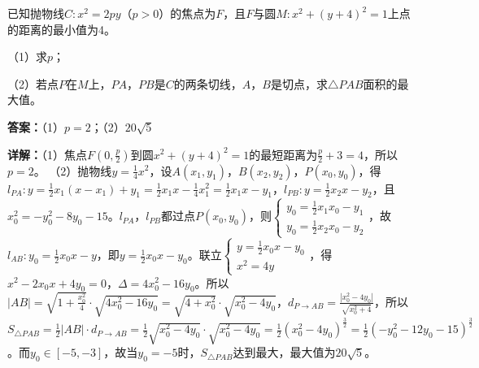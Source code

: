 \begin{question}[points=12]
已知抛物线$C:x^2=2py$（$p>0$）的焦点为$F$，且$F$与圆$M:x^2+(y+4)^2=1$上点的距离的最小值为4。

（1）求$p$；

（2）若点$P$在$M$上，$PA$，$PB$是$C$的两条切线，$A$，$B$是切点，求$\triangle PAB$面积的最大值。
\begin{solution}
\textbf{答案：}（1）$p=2$；（2）$20\sqrt{5}$

\textbf{详解：}（1）焦点$F(0,\frac{p}{2})$到圆$x^2+(y+4)^2=1$的最短距离为$\frac{p}{2}+3=4$，所以$p=2$。
（2）抛物线$y=\frac14x^2$，设$A(x_1,y_1)$，$B(x_2,y_2)$，$P(x_0,y_0)$，得$l_{PA}: y=\frac12x_1(x-x_1)+y_1=\frac12x_1x-\frac14x_1^2=\frac12x_1x-y_1$，$l_{PB}: y=\frac12x_2x-y_2$，且$x_0^2=-y_0^2-8y_0-15$。$l_{PA}$，$l_{PB}$都过点$P(x_0,y_0)$，则$\begin{cases} y_0=\frac12x_1x_0-y_1 \\ y_0=\frac12x_2x_0-y_2 \end{cases}$，故$l_{AB}: y_0=\frac12x_0x-y$，即$y=\frac12x_0x-y_0$。联立$\begin{cases} y=\frac12x_0x-y_0 \\ x^2=4y \end{cases}$，得$x^2-2x_0x+4y_0=0$，$\Delta=4x_0^2-16y_0$。所以$|AB|=\sqrt{1+\frac{x_0^2}{4}}\cdot\sqrt{4x_0^2-16y_0}=\sqrt{4+x_0^2}\cdot\sqrt{x_0^2-4y_0}$，$d_{P\to AB}=\frac{|x_0^2-4y_0|}{\sqrt{x_0^2+4}}$，所以$S_{\triangle PAB}=\frac12|AB|\cdot d_{P\to AB}=\frac12\sqrt{x_0^2-4y_0}\cdot\sqrt{x_0^2-4y_0}=\frac12(x_0^2-4y_0)^{\frac32}=\frac12(-y_0^2-12y_0-15)^{\frac32}$。而$y_0\in[-5,-3]$，故当$y_0=-5$时，$S_{\triangle PAB}$达到最大，最大值为$20\sqrt{5}$。
\end{solution}
\end{question}

